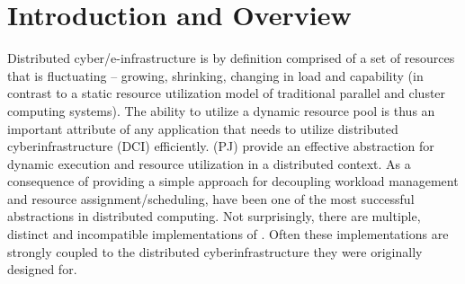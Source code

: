 \documentclass{sig-alternate}
\begin{document}
\section{Introduction and Overview} 

Distributed cyber/e-infrastructure is by definition comprised of a set
of resources that is fluctuating -- growing, shrinking, changing in
load and capability (in contrast to a static resource utilization
model of traditional parallel and cluster computing systems).  The
ability to utilize a dynamic resource pool is thus an important
attribute of any application that needs to utilize distributed
cyberinfrastructure (DCI) efficiently. \pilotjobs (PJ) provide an
effective abstraction for dynamic execution and resource utilization
in a distributed context. As a consequence of providing a simple
approach for decoupling workload management and resource
assignment/scheduling, \pilotjobs have been one of the most successful
abstractions in distributed computing.  Not surprisingly, there are
multiple, distinct and incompatible implementations of
\pilotjobs. Often these implementations are strongly coupled to the
distributed cyberinfrastructure they were originally designed for.


\end{document}

